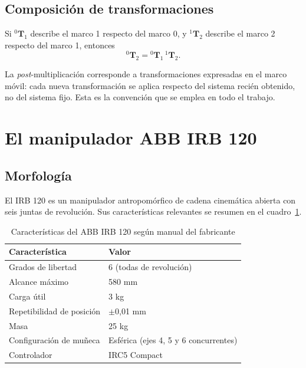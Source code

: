 \documentclass[11pt,a4paper]{article}
\newcommand{\T}[2]{{}^{#1}\mathbf{T}_{#2}}
\begin{document}
\subsection{Composición de transformaciones}

Si $\T{0}{1}$ describe el marco 1 respecto del marco 0, y $\T{1}{2}$
describe el marco 2 respecto del marco 1, entonces
\begin{equation}
\T{0}{2} = \T{0}{1}\,\T{1}{2}.
\end{equation}

La \emph{post}-multiplicación corresponde a transformaciones expresadas
en el marco móvil: cada nueva transformación se aplica respecto del
sistema recién obtenido, no del sistema fijo. Esta es la convención que
se emplea en todo el trabajo.

\section{El manipulador ABB IRB 120}

\subsection{Morfología}

El IRB 120 es un manipulador antropomórfico de cadena cinemática abierta
con seis juntas de revolución. Sus características relevantes se
resumen en el cuadro~\ref{tab:specs}.

\begin{table}[h]
\centering
\caption{Características del ABB IRB 120 según manual del fabricante}
\label{tab:specs}
\small
\begin{tabular}{@{}ll@{}}
\toprule
\textbf{Característica} & \textbf{Valor} \\
\midrule
Grados de libertad & 6 (todas de revolución) \\
Alcance máximo & 580 mm \\
Carga útil & 3 kg \\
Repetibilidad de posición & $\pm$0,01 mm \\
Masa & 25 kg \\
Configuración de muñeca & Esférica (ejes 4, 5 y 6 concurrentes) \\
Controlador & IRC5 Compact \\
\bottomrule
\end{tabular}
\end{table}
\end{document}
